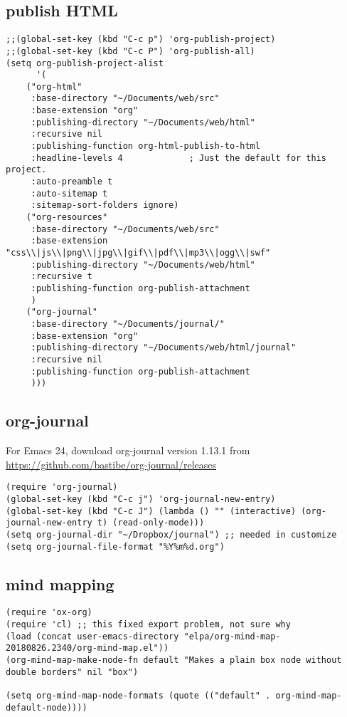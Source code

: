 \documentclass[11pt]{article}
\begin{document}
\subsection{publish HTML}
\label{sec:orgc73abe3}
\begin{verbatim}
;;(global-set-key (kbd "C-c p") 'org-publish-project)
;;(global-set-key (kbd "C-c P") 'org-publish-all)
(setq org-publish-project-alist
      '(
	("org-html"
	 :base-directory "~/Documents/web/src"
	 :base-extension "org"
	 :publishing-directory "~/Documents/web/html"
	 :recursive nil
	 :publishing-function org-html-publish-to-html
	 :headline-levels 4             ; Just the default for this project.
	 :auto-preamble t
	 :auto-sitemap t
	 :sitemap-sort-folders ignore)
	("org-resources"
	 :base-directory "~/Documents/web/src" 
	 :base-extension "css\\|js\\|png\\|jpg\\|gif\\|pdf\\|mp3\\|ogg\\|swf"
	 :publishing-directory "~/Documents/web/html"
	 :recursive t
	 :publishing-function org-publish-attachment
	 )
	("org-journal"
	 :base-directory "~/Documents/journal/"
	 :base-extension "org"
	 :publishing-directory "~/Documents/web/html/journal" 
	 :recursive nil
	 :publishing-function org-publish-attachment
	 )))
\end{verbatim}

\subsection{org-journal}
\label{sec:orgc35aed6}



For Emacs 24, download org-journal version 1.13.1 from
\url{https://github.com/bastibe/org-journal/releases}
\begin{verbatim}
(require 'org-journal)
(global-set-key (kbd "C-c j") 'org-journal-new-entry)
(global-set-key (kbd "C-c J") (lambda () "" (interactive) (org-journal-new-entry t) (read-only-mode)))
(setq org-journal-dir "~/Dropbox/journal") ;; needed in customize
(setq org-journal-file-format "%Y%m%d.org")
\end{verbatim}

\subsection{mind mapping}
\label{sec:org76545c3}
\begin{verbatim}
(require 'ox-org)
(require 'cl) ;; this fixed export problem, not sure why     
(load (concat user-emacs-directory "elpa/org-mind-map-20180826.2340/org-mind-map.el"))
(org-mind-map-make-node-fn default "Makes a plain box node without double borders" nil "box")

(setq org-mind-map-node-formats (quote (("default" . org-mind-map-default-node))))
\end{verbatim}
\end{document}
